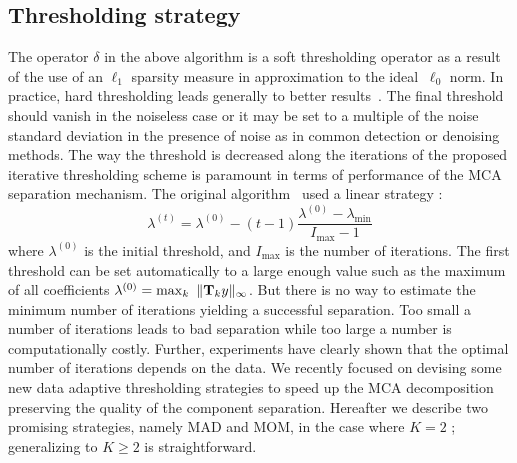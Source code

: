 	\subsection{Thresholding strategy}
The operator $\delta$ in the above algorithm is a soft thresholding operator as a result of the use of an 
${ \ell_1}$ sparsity measure in approximation to the ideal $ ~ \ell_0$ norm. In practice, hard thresholding 
leads generally to better results~\cite{starck:sta04}. The final threshold should vanish in the { noiseless} 
case or it may be set to a multiple of the noise standard deviation in the presence of noise as in common 
detection or denoising methods. The way the threshold is decreased along the iterations of the proposed 
iterative thresholding scheme is paramount in terms of performance of the MCA separation mechanism. 
The original algorithm~\cite{starck:sta04} used a linear strategy :  
\begin{equation}
\lambda^{(t)} = \lambda^{(0)} - (t-1)\frac{\lambda^{(0)} -\lambda_{\min}}{I_{\max}-1}
\end{equation}
where $\lambda^{(0)}$ is the initial threshold, and $I_{\max}$ is the number of iterations. The first threshold 
can be set automatically to a large enough value such as the maximum of all coefficients { $\lambda^{(0)}=\max_k~\|{\bf T}_k y\|_\infty$}. 
But there is no way to estimate the minimum number of iterations yielding a successful separation. Too small a number 
of iterations leads to bad separation while too large a number is computationally costly. Further, experiments have 
clearly shown that the optimal number of iterations depends on the data. We recently focused on devising some new data 
adaptive thresholding strategies to speed up the MCA decomposition preserving the quality of the component separation. 
Hereafter we describe two promising strategies, namely MAD and MOM, in the case where $K = 2$ ; 
generalizing to $K\geq2$ is straightforward.
